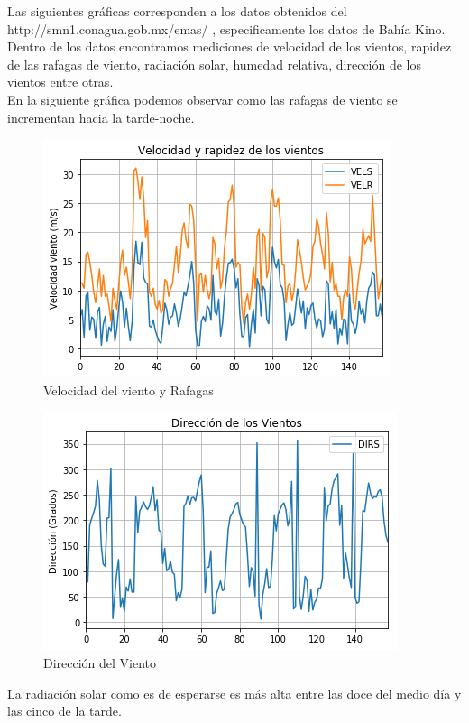 \documentclass[12pt,a4paper]{article}
\begin{document}
Las siguientes gráficas corresponden a los datos obtenidos del http://smn1.conagua.gob.mx/emas/  , especificamente los datos de Bahía Kino. Dentro de los datos encontramos mediciones de velocidad de los vientos, rapidez de las rafagas de viento, radiación solar, humedad relativa, dirección de los vientos entre otras.
\\

En la siguiente gráfica podemos observar como las rafagas de viento se incrementan hacia la tarde-noche.

\begin{figure}[H]
  \centering
  \includegraphics[scale=0.7]{velrap_vientos.png}
  \caption{Velocidad del viento y Rafagas}
  \label{fig:VyR}
\end{figure}



\begin{figure}[H]
  \centering
  \includegraphics[scale=0.7]{dir_viento.png}
  \caption{Dirección del Viento}
  \label{fig:DirVie}
\end{figure}

La radiación solar como es de esperarse es más alta entre las doce del medio día y las cinco de la tarde.
\end{document}
